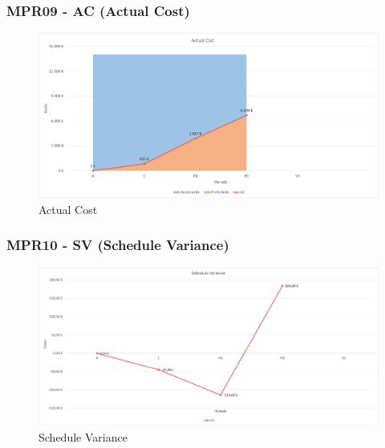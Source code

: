\subsubsection{MPR09 - AC (Actual Cost)}
\begin{figure}[!ht]
    \caption{Actual Cost}
    \vspace{10px}
    \includegraphics[scale=0.5]{sezioni/immagini/ActualCost.png}
    \centering
\end{figure}
\subsubsection{MPR10 - SV (Schedule Variance)}
\begin{figure}[!ht]
    \caption{Schedule Variance}
    \vspace{10px}
    \includegraphics[scale=0.5]{sezioni/immagini/ScheduleVariance.png}
    \centering
\end{figure}
\pagebreak
